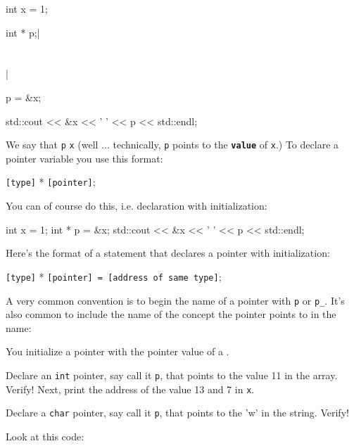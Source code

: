 \begin{consolethree}[escapeinside=||]
int x = 1;

int * p;|\\\\\\|

p = &x;         

std::cout << &x << ' ' << p << std::endl;
\end{consolethree}
\newpage
We say that \texttt{p}  \texttt{x} (well ... technically, \texttt{p} points to the \texttt{\textbf{value}} of \texttt{x}.) To declare a pointer variable you use this format:
\begin{center}
\texttt{[type]} * \texttt{[pointer]};
\end{center}
You can of course do this, i.e. declaration with initialization:

\begin{consolethree}[escapeinside=||]
int x = 1;
int * p = &x;
std::cout << &x << ' ' << p << std::endl;
\end{consolethree}
Here's the format of a statement that declares a pointer with
initialization:

\begin{center}
\texttt{[type]} * \texttt{[pointer] = [address of same type]};
\end{center}

A very common convention is to begin the name of a pointer with \texttt{p} or \texttt{p\_}. It's also common to include the name of the concept the pointer points to in the name:


You  initialize a pointer with the pointer value of a .


Declare an \texttt{int} pointer, say call it \texttt{p}, that points to the value 11 in the array. Verify! Next, print the address of the value 13 and 7 in \texttt{x}.

Declare a \texttt{char} pointer, say call it \texttt{p}, that points to the
'w' in the string. Verify!

\newpage{}

Look at this code:

